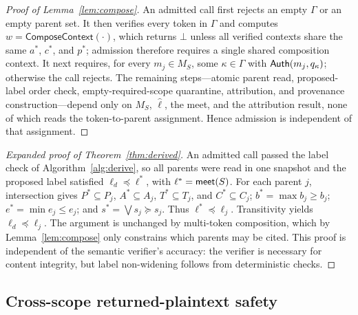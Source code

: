 \begin{proof}[Proof of Lemma~\ref{lem:compose}]
An admitted call first rejects an empty $\Gamma$ or an empty parent set. It then verifies every token in $\Gamma$ and computes $w=\mathsf{ComposeContext}(\cdot)$, which returns $\bot$ unless all verified contexts share the same $a^*$, $c^*$, and $p^*$; admission therefore requires a single shared composition context. It next requires, for every $m_j\in M_S$, some $\kappa\in\Gamma$ with $\mathsf{Auth}(m_j,q_\kappa)$; otherwise the call rejects. The remaining steps---atomic parent read, proposed-label order check, empty-required-scope quarantine, attribution, and provenance construction---depend only on $M_S$, $\hat\ell$, the meet, and the attribution result, none of which reads the token-to-parent assignment. Hence admission is independent of that assignment.
\end{proof}

\begin{proof}[Expanded proof of Theorem~\ref{thm:derived}]
An admitted call passed the label check of Algorithm~\ref{alg:derive}, so all parents were read in one snapshot and the proposed label satisfied $\ell_d\preceq\ell^*$, with $\ell^*=\mathsf{meet}(S)$. For each parent $j$, intersection gives $P^*\subseteq P_j$, $A^*\subseteq A_j$, $T^*\subseteq T_j$, and $C^*\subseteq C_j$; $b^*=\max b_j\ge b_j$; $e^*=\min e_j\le e_j$; and $s^*=\bigvee s_j\succeq s_j$. Thus $\ell^*\preceq\ell_j$. Transitivity yields $\ell_d\preceq\ell_j$. The argument is unchanged by multi-token composition, which by Lemma~\ref{lem:compose} only constrains which parents may be cited. This proof is independent of the semantic verifier's accuracy: the verifier is necessary for content integrity, but label non-widening follows from deterministic checks.
\end{proof}

\subsection{Cross-scope returned-plaintext safety}
\label{app:proof-crossscope}

